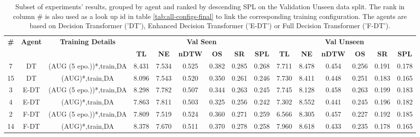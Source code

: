 \begin{table}
\centering
\caption{\label{tab:dagger_envdrop}Subset of experiments' results, grouped by agent and ranked by descending SPL on the Validation Unseen data split. The rank in column \# is also used as a look up id in table \ref{tab:all-configs-final} to link the corresponding training configuration.     \newline The agents are based on Decision Transformer ('DT'), Enhanced Decision Transformer ('E-DT') or Full Decision Transformer ('F-DT').}
\begin{tabular}{@{\hskip3pt}c@{\hskip3pt}c@{\hskip3pt}c@{\hskip3pt}c@{\hskip3pt}c@{\hskip3pt}c@{\hskip3pt}c@{\hskip3pt}c@{\hskip3pt}c@{\hskip3pt}c@{\hskip3pt}c@{\hskip3pt}c@{\hskip3pt}c@{\hskip3pt}c@{\hskip3pt}c}
\toprule
\textbf{\#} & \textbf{Agent} & \textbf{Training Details} & \multicolumn{6}{c}{\textbf{Val Seen}} & \multicolumn{6}{c}{\textbf{Val Unseen}} \\
\cmidrule(l){4-9} \cmidrule(l){10-15} \textbf{~} &     \textbf{~} &                \textbf{~} &       \textbf{TL} & \textbf{NE} & \textbf{nDTW} & \textbf{OS} & \textbf{SR} & \textbf{SPL} &         \textbf{TL} & \textbf{NE} & \textbf{nDTW} & \textbf{OS} & \textbf{SR} & \textbf{SPL} \\
\midrule
          7 &             DT &  (AUG (5 epo.))*,train,DA &             8.431 &       7.534 &         0.525 &       0.382 &       0.285 &        0.268 &               7.711 &       8.478 &         0.454 &       0.256 &       0.191 &        0.178 \\
         15 &             DT &           (AUG)*,train,DA &             8.096 &       7.543 &         0.520 &       0.350 &       0.261 &        0.246 &               7.730 &       8.411 &         0.448 &       0.251 &       0.183 &        0.165 \\
          3 &           E-DT &  (AUG (5 epo.))*,train,DA &             8.298 &       7.782 &         0.507 &       0.344 &       0.263 &        0.245 &               7.745 &       8.128 &         0.458 &       0.263 &       0.199 &        0.183 \\
          4 &           E-DT &           (AUG)*,train,DA &             7.863 &       7.811 &         0.503 &       0.325 &       0.256 &        0.242 &               7.302 &       8.552 &         0.441 &       0.245 &       0.196 &        0.182 \\
          2 &           F-DT &  (AUG (5 epo.))*,train,DA &             7.809 &       7.519 &         0.524 &       0.360 &       0.271 &        0.259 &               6.566 &       8.305 &         0.457 &       0.227 &       0.192 &        0.185 \\
         14 &           F-DT &           (AUG)*,train,DA &             8.378 &       7.670 &         0.511 &       0.370 &       0.278 &        0.258 &               7.960 &       8.618 &         0.433 &       0.235 &       0.178 &        0.165 \\
\bottomrule
\end{tabular}
\end{table}
